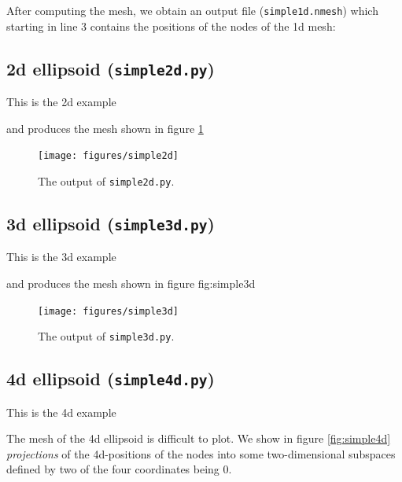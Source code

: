 \documentclass[10pt,a4paper]{book}
\newcommand{\py}[1]{\texttt{\color{blue}#1}}
\begin{document}
After computing the mesh, we obtain an output file (\texttt{simple1d.nmesh}) which starting in line 3 contains the positions of the nodes of the 1d mesh:




\subsection{2d ellipsoid (\texttt{simple2d.py})}

This is the 2d example 

and produces the mesh shown in figure \ref{fig:simple2d}
\begin{figure}[tbhp]
\centerline{\texttt{[image: figures/simple2d]}}
\caption{\label{fig:simple2d} The output of \py{simple2d.py}.}
\end{figure}


\subsection{3d ellipsoid (\texttt{simple3d.py})}

This is the 3d example 

and produces the mesh shown in figure {fig:simple3d}
\begin{figure}[tbhp]
\centerline{\texttt{[image: figures/simple3d]}}
\caption{\label{fig:simple3d} The output of \py{simple3d.py}.}
\end{figure}


\subsection{4d ellipsoid (\texttt{simple4d.py})}

This is the 4d example 

The mesh of the 4d ellipsoid is difficult to plot. We show in figure \ref{fig:simple4d} \emph{projections} of the 4d-positions of the nodes into some two-dimensional subspaces defined by two of the four coordinates being 0.
\end{document}
